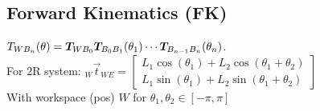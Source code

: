 \subsection{Forward Kinematics (FK)}
$T_{WB_n}(\theta) = \bm{T}_{WB_0} \bm{T}_{B_0B_1}(\theta_1) \cdots \bm{T}_{B_{n - 1}B_n}(\theta_n)$.\\
For 2R system: ${_W}\vec{t}_{WE} = \begin{bmatrix}
    L_1 \cos(\theta_1) + L_2 \cos(\theta_1 + \theta_2)\\
    L_1 \sin(\theta_1) + L_2 \sin(\theta_1 + \theta_2)
\end{bmatrix}$\\
With workspace (pos) $W$ for $\theta_1, \theta_2 \in [-\pi, \pi]$
